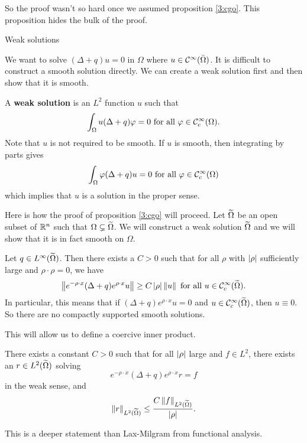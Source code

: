 So the proof wasn't so hard once we assumed proposition \ref{3:cgo}.
This proposition hides the bulk of the proof.

Weak solutions

We want to solve $(\Delta+q)u=0$ in $\Omega$ where $u \in \mathcal{C}^\infty(\bar\Omega)$.
It is difficult to construct a smooth solution directly.
We can create a weak solution first and then show that it is smooth.

\begin{defn}
  A \textbf{weak solution} is an $L^2$ function $u$ such that
  \[ \int_\Omega u(\Delta+q)\varphi = 0 \text{ for all } \varphi \in \mathcal{C}_c^\infty(\Omega). \]
  Note that $u$ is not required to be smooth.
  If $u$ is smooth, then integrating by parts gives
  \[ \int_\Omega \varphi(\Delta+q)u=0 \text{ for all } \varphi \in \mathcal{C}_c^\infty(\Omega) \]
  which implies that $u$ is a solution in the proper sense.
\end{defn}

Here is how the proof of proposition \ref{3:cgo} will proceed.
Let $\widetilde\Omega$ be an open subset of $\mathbb{R}^n$ such that $\Omega \subsetneq \widetilde\Omega$.
We will construct a weak solution $\widetilde\Omega$ and we will show that it is in fact smooth on $\Omega$.

\begin{prop}\label{3:est}
  Let $q \in L^\infty(\widetilde\Omega)$.
  Then there exists a $C>0$ such that for all $\rho$ with $\left\lvert \rho \right\rvert$ sufficiently large and $\rho\cdot\rho=0$, we have
  \[ \left\lVert e^{-\rho \cdot x}(\Delta+q)e^{\rho\cdot x} u \right\rVert \geq C\left\lvert \rho \right\rvert\left\lVert u \right\rVert \text{ for all } u \in \mathcal{C}_c^\infty(\widetilde\Omega). \]
  In particular, this means that if $(\Delta+q)e^{\rho\cdot x}u=0$ and $u \in \mathcal{C}_c^\infty(\widetilde\Omega)$, then $u \equiv 0$.
  So there are no compactly supported smooth solutions.
\end{prop}

This will allow us to define a coercive inner product.

\begin{cor}[Solvability]\label{3:solv}
  There exists a constant $C>0$ such that for all $\left\lvert \rho \right\rvert$ large and $f \in L^2$, there exists an $r \in L^2(\widetilde\Omega)$ solving 
  \[ e^{-\rho\cdot x}(\Delta+q)e^{\rho\cdot x}r=f \]
  in the weak sense, and
  \[ \left\lVert r \right\rVert_{L^2(\widetilde\Omega)} \leq \frac{C\left\lVert f \right\rVert_{L^2(\widetilde\Omega)}}{\left\lvert \rho \right\rvert}. \]
\end{cor}

This is a deeper statement than Lax-Milgram from functional analysis.

